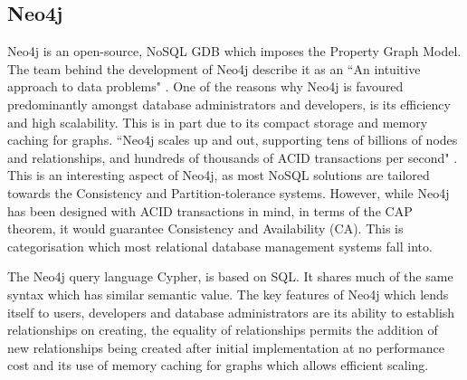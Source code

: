\subsection{Neo4j}\label{neo}
Neo4j is an open-source, NoSQL GDB which imposes the Property Graph Model. The team behind the development of Neo4j describe it as an ``An intuitive approach to data problems" \cite{ndweb}. One of the reasons why Neo4j is favoured predominantly amongst database administrators and developers, is its efficiency and high scalability. This is in part due to its compact storage and memory caching for graphs. ``Neo4j scales up and out, supporting tens of billions of nodes and relationships, and hundreds of thousands of ACID transactions per second" \cite{ndweb}. This is an interesting aspect of Neo4j, as most NoSQL solutions are tailored towards the Consistency and Partition-tolerance systems. However, while Neo4j has been designed with ACID transactions in mind, in terms of the CAP theorem, it would guarantee Consistency and Availability (CA). This is categorisation which most relational database management systems fall into.

The Neo4j query language Cypher, is based on SQL. It shares much of the same syntax which has similar semantic value. The key features of Neo4j which lends itself to users, developers and database administrators are its ability to establish relationships on creating, the equality of relationships permits the addition of new relationships being created after initial implementation at no performance cost and its use of memory caching for graphs which allows efficient scaling.

